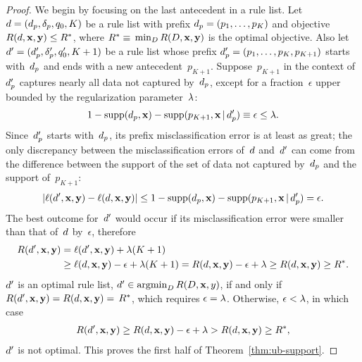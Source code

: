 \begin{proof}
We begin by focusing on the last antecedent in a rule list.
%
Let ${{d} = (d_p, \delta_p, q_0, K)}$
be a rule list with prefix ${d_p = (p_1, \dots, p_K)}$
and objective ${R({d}, \mathbf{x}, \mathbf{y}) \le R^*}$, where
${R^* \equiv}$ ${\min_{{D}} R({D}, \mathbf{x}, \mathbf{y})}$
is the optimal objective.
%
Also let ${{d}' = (d_p', \delta_p', q_0', K + 1)}$
be a rule list whose prefix ${d_p' = (p_1, \dots, p_K, p_{K+1})}$
starts with~$d_p$ and ends with a new antecedent~$p_{K+1}$.
%
Suppose~$p_{K+1}$ in the context of~$d_p'$ captures nearly all
data not captured by~$d_p$, except for a fraction~$\epsilon$
upper bounded by the regularization parameter~${\lambda}$:
\begin{align}
1 - \textnormal{supp}(d_p, \mathbf{x}) - \textnormal{supp}(p_{K+1}, \mathbf{x} \,|\, d_p') \equiv \epsilon \le {\lambda}.
\end{align}
%
Since~$d_p'$ starts with~$d_p$,
its prefix misclassification error is at least as great;
the only discrepancy between the misclassification errors
of~${d}$ and~${d}'$ can come from the difference between the support of
the set of data not captured by~$d_p$ and the support of~$p_{K+1}$:
\begin{align}
| \ell({d}', \mathbf{x}, \mathbf{y}) - \ell({d}, \mathbf{x}, \mathbf{y}) | \le
1 - \textnormal{supp}(d_p, \mathbf{x}) - \textnormal{supp}(p_{K+1}, \mathbf{x} \,|\, d_p') = \epsilon.
\end{align}
The best outcome for~${d}'$ would occur if its misclassification
error were smaller than that of~${d}$ by~$\epsilon$,
%
therefore
\begin{align}
R({d}', \mathbf{x}, \mathbf{y}) &= \ell({d}', \mathbf{x}, \mathbf{y}) + {\lambda} (K+1) \nonumber \\
&\ge \ell({d}, \mathbf{x}, \mathbf{y}) - \epsilon + {\lambda}(K+1)
= R({d}, \mathbf{x}, \mathbf{y}) - \epsilon + {\lambda} \ge R({d}, \mathbf{x}, \mathbf{y}) \ge R^*.
\end{align}
${d}'$ is an optimal rule list,
\ie ${{d}' \in \operatorname*{argmin}_{{D}} R({D}, \mathbf{x}, y)}$,
if and only if ${R({d}', \mathbf{x}, \mathbf{y}) = R({d}, \mathbf{x}, \mathbf{y}) =}$ ${R^*}$,
which requires ${\epsilon = {\lambda}}$.
%
Otherwise, ${\epsilon < {\lambda}}$, in which case
\begin{align}
R({d}', \mathbf{x}, \mathbf{y}) \ge R({d}, \mathbf{x}, \mathbf{y}) - \epsilon + {\lambda}
> R({d}, \mathbf{x}, \mathbf{y}) \ge R^*,
\end{align}
\ie ${d}'$ is not optimal.
%
This proves the first half of Theorem~\ref{thm:ub-support}.


\end{proof}

